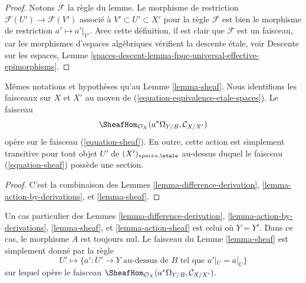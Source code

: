 \begin{proof}
Notons $\mathcal{F}$ la règle du lemme.
Le morphisme de restriction $\mathcal{F}(U') \to \mathcal{F}(V')$ associé à
$V' \subset U' \subset X'$
pour la règle $\mathcal{F}$ est bien le morphisme de restriction $a' \mapsto a'|_{V'}$.
Avec cette définition, il est clair que $\mathcal{F}$ est un
faisceau, car les morphismes d'espaces algébriques vérifient la descente étale, voir
Descente sur les espaces,
Lemme \ref{spaces-descent-lemma-fpqc-universal-effective-epimorphisms}.
\end{proof}

\begin{lemma}
\label{lemma-action-sheaf}
Mêmes notations et hypothèses qu'au Lemme \ref{lemma-sheaf}.
Nous identifions les faisceaux sur $X$ et $X'$ au moyen de
(\ref{equation-equivalence-etale-spaces}).
Le faisceau
$$
\SheafHom_{\mathcal{O}_X}(a^*\Omega_{Y/B}, \mathcal{C}_{X/X'})
$$
opère sur le faisceau (\ref{equation-sheaf}). En outre, cette action
est simplement transitive pour tout objet $U'$ de $(X')_{spaces, \etale}$
au-dessus duquel le faisceau (\ref{equation-sheaf}) possède une section.
\end{lemma}

\begin{proof}
C'est la combinaison des
Lemmes \ref{lemma-difference-derivation},
\ref{lemma-action-by-derivations},
et \ref{lemma-sheaf}.
\end{proof}

\begin{remark}
\label{remark-special-case}
Un cas particulier des
Lemmes \ref{lemma-difference-derivation},
\ref{lemma-action-by-derivations},
\ref{lemma-sheaf}, et
\ref{lemma-action-sheaf}
est celui où $Y = Y'$. Dans ce cas, le morphisme $A$ est toujours nul.
Le faisceau du
Lemme \ref{lemma-sheaf}
est simplement donné par la règle
$$
U' \mapsto
\{a' : U' \to Y\text{ au-dessus de }B\text{ tel que } a'|_U = a|_U\}
$$
sur lequel opère le faisceau
$\SheafHom_{\mathcal{O}_X}(a^*\Omega_{Y/B}, \mathcal{C}_{X/X'})$.
\end{remark}

